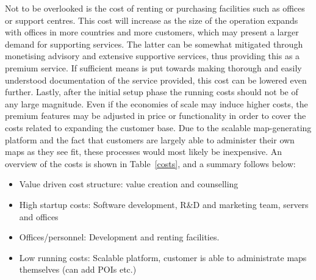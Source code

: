 Not to be overlooked is the cost of renting or purchasing facilities such as offices or support centres. This cost will increase as the size of the operation expands with offices in more countries and more customers, which may present a larger demand for supporting services. The latter can be somewhat mitigated through monetising advisory and extensive supportive services, thus providing this as a premium service. If sufficient means is put towards making thorough and easily understood documentation of the service provided, this cost can be lowered even further. Lastly, after the initial setup phase the running costs should not be of any large magnitude. Even if the economies of scale may induce higher costs, the premium features may be adjusted in price or functionality in order to cover the costs related to expanding the customer base. Due to the scalable map-generating platform and the fact that customers are largely able to administer their own maps as they see fit, these processes would most likely be inexpensive. An overview of the costs is shown in Table~\ref{costs}, and a summary follows below:


\begin{itemize}
    \item Value driven cost structure: value creation and counselling
    \item High startup costs: Software development, R\&D and marketing team, servers and offices
    \item Offices/personnel: Development and renting facilities.
    \item Low running costs: Scalable platform, customer is able to administrate maps themselves (can add POIs etc.)
\end{itemize}



